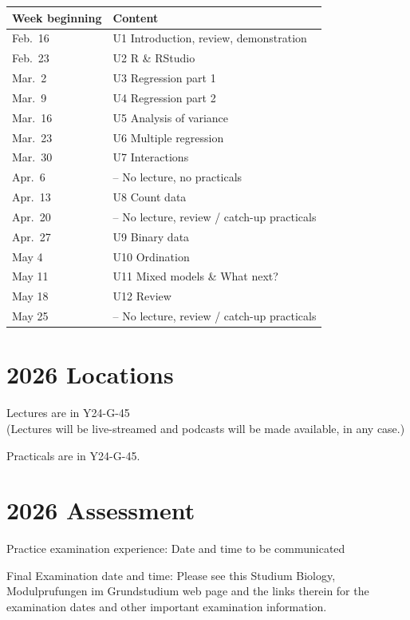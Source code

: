 \documentclass[
  letterpaper,
  8pt,
  a4paper]{book}
\begin{document}
\begin{longtable}[]{@{}ll@{}}
\toprule\noalign{}
Week beginning & Content \\
\midrule\noalign{}
\endhead
\bottomrule\noalign{}
\endlastfoot
Feb.~16 & U1 Introduction, review, demonstration \\
Feb.~23 & U2 R \& RStudio \\
Mar.~2 & U3 Regression part 1 \\
Mar.~9 & U4 Regression part 2 \\
Mar.~16 & U5 Analysis of variance \\
Mar.~23 & U6 Multiple regression \\
Mar.~30 & U7 Interactions \\
Apr.~6 & -- No lecture, no practicals \\
Apr.~13 & U8 Count data \\
Apr.~20 & -- No lecture, review / catch-up practicals \\
Apr.~27 & U9 Binary data \\
May 4 & U10 Ordination \\
May 11 & U11 Mixed models \& What next? \\
May 18 & U12 Review \\
May 25 & -- No lecture, review / catch-up practicals \\
\end{longtable}

\section*{2026 Locations}\label{locations}


Lectures are in Y24-G-45\\
(Lectures will be live-streamed and podcasts will be made available, in
any case.)

Practicals are in Y24-G-45.

\section*{2026 Assessment}\label{assessment-1}


Practice examination experience: Date and time to be communicated

Final Examination date and time: Please see this Studium Biology,
Modulprufungen im Grundstudium web page and the links therein for the
examination dates and other important examination information.
\end{document}
